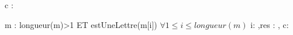 \begin{algorithme}%
        {c : \caractere}%
        {\booleen}%
        {}
         {%
            {}%
            {}%
        }%
 \end{algorithme}

 \begin{algorithme}%
        {m : \chaine}%
        {\booleen}%
        {longueur(m)>1 ET estUneLettre(m[i]) $\forall 1\leq i \leq longueur(m)$}
        {i: \entier,res : \booleen, c: \caractere}
         {%
            {}%
           {
                {%
                }
            }%
            {}%
        }
 \end{algorithme}
